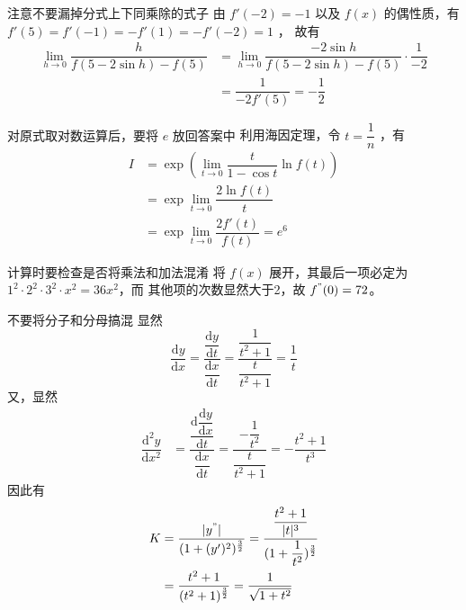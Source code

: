 \begin{answer}[660T29]{注意不要漏掉分式上下同乘除的式子}
    由 $ f'(-2) = -1 $ 以及 $ f(x) $ 的偶性质，有 $f'(5) = f'(-1) = -f'(1) = -f'(-2) = 1 $ ，
    故有\begin{equation*}
        \begin{aligned}
            {\displaystyle\lim_{h\rightarrow 0}}\dfrac{h}{f(5-2\sin h)-f(5)} &= 
            {\displaystyle\lim_{h\rightarrow 0}}\dfrac{-2\sin h}{f(5-2\sin h)-f(5)} \cdot \dfrac{1}{-2}\\&=
            \dfrac{1}{-2f'(5)} = -\dfrac{1}{2}
        \end{aligned}
    \end{equation*}
\end{answer}

\begin{answer}[660T30]{对原式取对数运算后，要将 $ e $ 放回答案中}
    利用海因定理，令 $ t = \dfrac{1}{n} $ ，有 \begin{equation*}
        \begin{aligned}
            I &= \exp \left( {\displaystyle\lim_{t\rightarrow 0}} 
            \dfrac{t}{1-\cos t}\ln f(t) \right)\\&=\exp{\displaystyle\lim_{t\rightarrow 0}}
            \dfrac{2\ln f(t)}{t}\\&=\exp{\displaystyle\lim_{t\rightarrow 0}}
            \dfrac{2f'(t)}{f(t)} = e^6
        \end{aligned}
    \end{equation*}
\end{answer}

\begin{answer}[600T33]{计算时要检查是否将乘法和加法混淆}
    将 $ f(x) $ 展开，其最后一项必定为 $ 1^2\cdot 2^2\cdot 3^2\cdot x^2 = 36x^2 $，而
    其他项的次数显然大于2，故 $ f^"(0) = 72$。
\end{answer}

\begin{answer}[660T34]{不要将分子和分母搞混}
    显然 $$ \dfrac{\mathrm{d}y}{\mathrm{d}x} = 
    \dfrac{\dfrac{\mathrm{d}y}{\mathrm{d}t}}{\dfrac{\mathrm{d}x}{\mathrm{d}t}}
    = \dfrac{\dfrac{1}{t^2+1}}{\dfrac{t}{t^2+1}} = \dfrac{1}{t} $$ 又，显然
    \begin{equation*}
        \begin{aligned}
            \dfrac{\mathrm{d}^2y}{\mathrm{d}x^2}&= 
            \dfrac{\dfrac{\mathrm{d}\dfrac{\mathrm{d}y}{\mathrm{d}x}}{\mathrm{d}t}}{\dfrac{\mathrm{d}x}{\mathrm{d}t}}
            =\dfrac{-\dfrac{1}{t^2}}{\dfrac{t}{t^2+1}} = -\dfrac{t^2+1}{t^3}
        \end{aligned}
    \end{equation*}
    因此有 \begin{equation*}
        \begin{aligned}
            K&= \dfrac{|y^"|}{(1+(y')^2)^{\frac{3}{2}}} = 
            \dfrac{\dfrac{t^2+1}{|t|^3}}{(1+\dfrac{1}{t^2})^{\frac{3}{2}}}
            \\&= \dfrac{t^2+1}{(t^2+1)^\frac{3}{2}} = \dfrac{1}{\sqrt{1+t^2}}
        \end{aligned}
    \end{equation*}
\end{answer}

